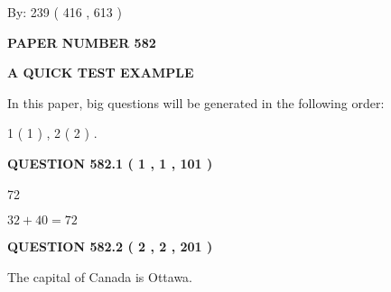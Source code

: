 \documentclass[12pt]{article}
\begin{document}
   
\hspace{1.0in} By: 
 239 ( 416 ,  613 )
   
   
   
   
\newpage 
\setcounter{page}{ 
   582001 } 
   
   
   
   
 {\textbf{ \Large{ PAPER NUMBER  582  }}}
   
   
\vspace{0.2in}
   
   
   
   
   
   
 \vspace{0.2in}
{\LARGE {\textbf{ A QUICK TEST EXAMPLE}}}
   
   
   
\vspace{0.2in}
   
In this paper, big questions will be generated in the following order: 
   
   
   1 ( 1 )
 ,
   2 ( 2 )
 .
  
\vspace{0.2in}
  
{\textbf{\Large{QUESTION
582.1 
 ( 1 , 1 , 101 )
}}}
  
  
 
 
\noindent{}

72
 
 
 
 
\noindent{}

$ %
32 +  %
40=   %
72$
 
 
  
\vspace{0.2in}
  
{\textbf{\Large{QUESTION
582.2 
 ( 2 , 2 , 201 )
}}}
  
  
 
 
\noindent{}
 
 
The capital of Canada is Ottawa.
 
 
 
 
   
   
 \vspace{0.2in}
 
\end{document}
